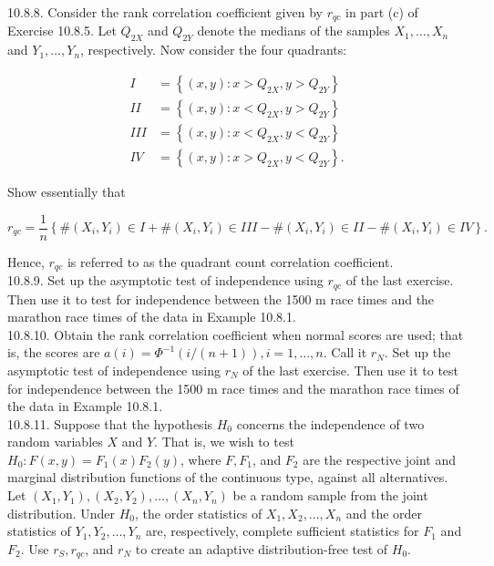 10.8.8. Consider the rank correlation coefficient given by $r_{q c}$ in part (c) of Exercise 10.8.5. Let $Q_{2 X}$ and $Q_{2 Y}$ denote the medians of the samples $X_{1}, \ldots, X_{n}$ and $Y_{1}, \ldots, Y_{n}$, respectively. Now consider the four quadrants:

$$
\begin{aligned}
I & =\left\{(x, y): x>Q_{2 X}, y>Q_{2 Y}\right\} \\
I I & =\left\{(x, y): x<Q_{2 X}, y>Q_{2 Y}\right\} \\
I I I & =\left\{(x, y): x<Q_{2 X}, y<Q_{2 Y}\right\} \\
I V & =\left\{(x, y): x>Q_{2 X}, y<Q_{2 Y}\right\} .
\end{aligned}
$$

Show essentially that


\begin{equation*}
r_{q c}=\frac{1}{n}\left\{\#\left(X_{i}, Y_{i}\right) \in I+\#\left(X_{i}, Y_{i}\right) \in I I I-\#\left(X_{i}, Y_{i}\right) \in I I-\#\left(X_{i}, Y_{i}\right) \in I V\right\} . \tag{10.8.18}
\end{equation*}


Hence, $r_{q c}$ is referred to as the quadrant count correlation coefficient.\\
10.8.9. Set up the asymptotic test of independence using $r_{q c}$ of the last exercise. Then use it to test for independence between the 1500 m race times and the marathon race times of the data in Example 10.8.1.\\
10.8.10. Obtain the rank correlation coefficient when normal scores are used; that is, the scores are $a(i)=\Phi^{-1}(i /(n+1)), i=1, \ldots, n$. Call it $r_{N}$. Set up the asymptotic test of independence using $r_{N}$ of the last exercise. Then use it to test for independence between the 1500 m race times and the marathon race times of the data in Example 10.8.1.\\
10.8.11. Suppose that the hypothesis $H_{0}$ concerns the independence of two random variables $X$ and $Y$. That is, we wish to test $H_{0}: F(x, y)=F_{1}(x) F_{2}(y)$, where $F, F_{1}$, and $F_{2}$ are the respective joint and marginal distribution functions of the continuous type, against all alternatives. Let $\left(X_{1}, Y_{1}\right),\left(X_{2}, Y_{2}\right), \ldots,\left(X_{n}, Y_{n}\right)$ be a random sample from the joint distribution. Under $H_{0}$, the order statistics of $X_{1}, X_{2}, \ldots, X_{n}$ and the order statistics of $Y_{1}, Y_{2}, \ldots, Y_{n}$ are, respectively, complete sufficient statistics for $F_{1}$ and $F_{2}$. Use $r_{S}, r_{q c}$, and $r_{N}$ to create an adaptive distribution-free test of $H_{0}$.

